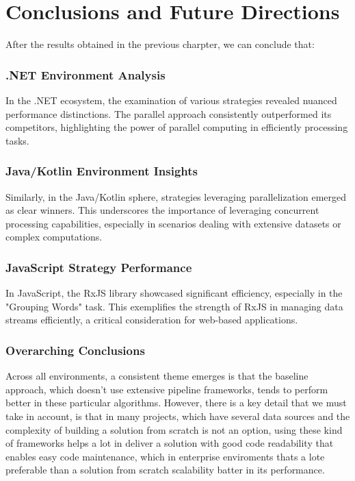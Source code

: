 \chapter{Conclusions and Future Directions}

After the results obtained in the previous charpter, we can conclude that:

\subsection{.NET Environment Analysis}
In the .NET ecosystem, the examination of various strategies revealed nuanced performance distinctions. The parallel approach consistently outperformed its competitors, highlighting the power of parallel computing in efficiently processing tasks.

\subsection{Java/Kotlin Environment Insights}
Similarly, in the Java/Kotlin sphere, strategies leveraging parallelization emerged as clear winners. This underscores the importance of leveraging concurrent processing capabilities, especially in scenarios dealing with extensive datasets or complex computations.

\subsection{JavaScript Strategy Performance}
In JavaScript, the RxJS library showcased significant efficiency, especially in the "Grouping Words" task. This exemplifies the strength of RxJS in managing data streams efficiently, a critical consideration for web-based applications.

\subsection{Overarching Conclusions}
Across all environments, a consistent theme emerges is that the baseline approach, which doesn't use extensive pipeline frameworks, tends to perform better in these particular algorithms. 
However, there is a key detail that we must take in account, is that in many projects, which have several data sources and the complexity of building a solution from scratch is not an option, using these kind of frameworks helps a lot in deliver a solution with good code readability that enables easy code maintenance, which in enterprise enviroments thats a lote preferable than a solution from scratch scalability batter in its performance.


